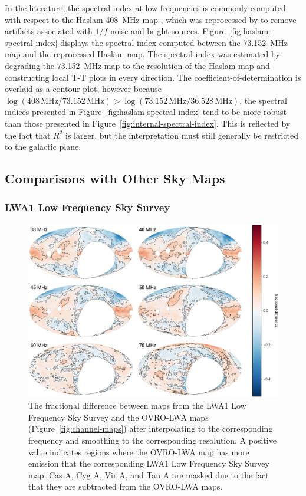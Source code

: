 \documentclass[twocolumn]{aastex61}
\begin{document}
In the literature, the spectral index at low frequencies is commonly computed with respect to the
Haslam 408~MHz map \citep{1981A&A...100..209H, 1982A&AS...47....1H}, which was reprocessed by
\citet{2015MNRAS.451.4311R} to remove artifacts associated with $1/f$ noise and bright sources.
Figure~\ref{fig:haslam-spectral-index} displays the spectral index computed between the 73.152~MHz
map and the reprocessed Haslam map. The spectral index was estimated by degrading the 73.152~MHz map
to the resolution of the Haslam map and constructing local T-T plots in every direction. The
coefficient-of-determination is overlaid as a contour plot, however because
$\log(408\,\text{MHz}/73.152\,\text{MHz}) > \log(73.152\,\text{MHz}/36.528\,\text{MHz})$, the
spectral indices presented in Figure~\ref{fig:haslam-spectral-index} tend to be more robust than
those presented in Figure~\ref{fig:internal-spectral-index}. This is reflected by the fact that
$R^2$ is larger, but the interpretation must still generally be restricted to the galactic plane.

\subsection{Comparisons with Other Sky Maps}\label{sec:compare}

\subsubsection{LWA1 Low Frequency Sky Survey}

\begin{figure}[t]
    \centering
    \includegraphics[width=\textwidth]{figures/lwa1/lwa1}
    \caption{
        The fractional difference between maps from the LWA1 Low Frequency Sky Survey and the
        OVRO-LWA maps (Figure~\ref{fig:channel-maps}) after interpolating to the corresponding
        frequency and smoothing to the corresponding resolution. A positive value indicates regions
        where the OVRO-LWA map has more emission that the corresponding LWA1 Low Frequency Sky
        Survey map. Cas A, Cyg A, Vir A, and Tau A are masked due to the fact that they are
        subtracted from the OVRO-LWA maps.
    }
    \label{fig:lwa1-comparison}
\end{figure}
\end{document}
